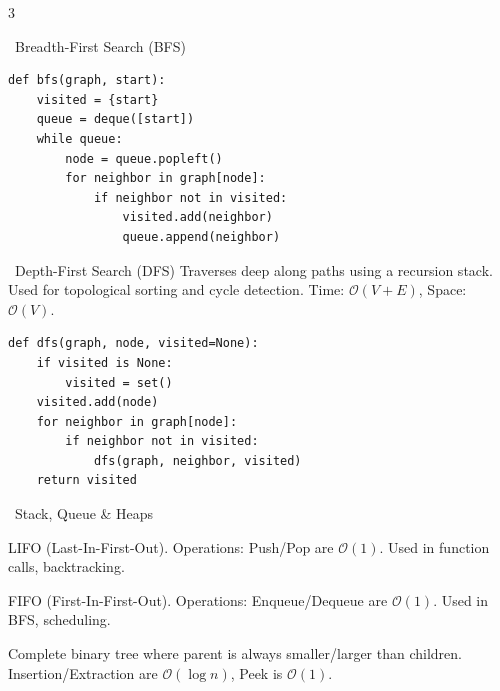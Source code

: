 \documentclass[10pt,landscape,letterpaper]{article}
\begin{document}
\begin{multicols*}{3}
\begin{topicbox}{\faProjectDiagram~Breadth-First Search (BFS)}
\begin{lstlisting}
def bfs(graph, start):
    visited = {start}
    queue = deque([start])
    while queue:
        node = queue.popleft()
        for neighbor in graph[node]:
            if neighbor not in visited:
                visited.add(neighbor)
                queue.append(neighbor)
  \end{lstlisting}
\end{topicbox}

\newpage


\begin{topicbox}{\faProjectDiagram~Depth-First Search (DFS)}
  \scriptsize Traverses deep along paths using a recursion stack. Used for topological sorting and cycle detection. Time: $\mathcal{O}(V + E)$, Space: $\mathcal{O}(V)$.
  \vspace{3pt}
  \begin{lstlisting}
def dfs(graph, node, visited=None):
    if visited is None:
        visited = set()
    visited.add(node)
    for neighbor in graph[node]:
        if neighbor not in visited:
            dfs(graph, neighbor, visited)
    return visited
  \end{lstlisting}
\end{topicbox}

\begin{topicbox}{\faLayerGroup~Stack, Queue \& Heaps}
  \scriptsize
  \begin{description}[leftmargin=3pt,itemsep=2pt,topsep=2pt,parsep=0pt]
    \item[\color{primary}Stack:] LIFO (Last-In-First-Out). Operations: Push/Pop are $\mathcal{O}(1)$. Used in function calls, backtracking.
    \item[\color{primary}Queue:] FIFO (First-In-First-Out). Operations: Enqueue/Dequeue are $\mathcal{O}(1)$. Used in BFS, scheduling.
    \item[\color{primary}Min-Heap / Max-Heap:] Complete binary tree where parent is always smaller/larger than children. Insertion/Extraction are $\mathcal{O}(\log n)$, Peek is $\mathcal{O}(1)$.
  \end{description}
\end{topicbox}

\columnbreak


\end{multicols*}
\end{document}
